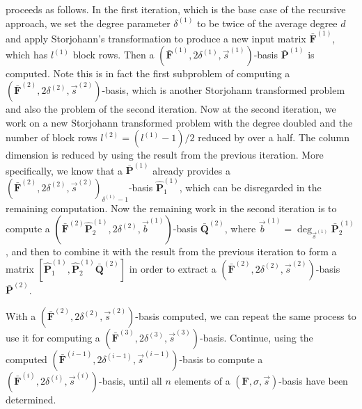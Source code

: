  proceeds as follows. In the first iteration,
which is the base case of the recursive approach, we set the degree
parameter $\delta^{\left(1\right)}$ to be twice of the average degree
$d$ and apply Storjohann's transformation to produce a new input
matrix $\bar{\mathbf{F}}^{\left(1\right)}$, which has $l^{\left(1\right)}$
block rows. Then a $(\bar{\mathbf{F}}^{\left(1\right)},2\delta^{\left(1\right)},\vec{s}^{\left(1\right)})$-basis
$\bar{\mathbf{P}}^{\left(1\right)}$ is computed. Note this is in
fact the first subproblem of computing a $(\bar{\mathbf{F}}^{\left(2\right)},2\delta^{\left(2\right)},\vec{s}^{\left(2\right)})$-basis,
which is another Storjohann transformed problem and also the problem
of the second iteration. Now at the second iteration, we work on a
new Storjohann transformed problem with the degree doubled and the
number of block rows $l^{\left(2\right)}=(l^{\left(1\right)}-1)/2$
reduced by over a half. The column dimension is reduced by using the
result from the previous iteration. More specifically, we know that
a $\bar{\mathbf{P}}^{\left(1\right)}$ already provides a $(\bar{\mathbf{F}}^{\left(2\right)},2\delta^{\left(2\right)},\vec{s}^{\left(2\right)})_{\delta^{\left(1\right)}-1}$-basis
$\hat{\mathbf{P}}_{1}^{\left(1\right)}$, which can be disregarded
in the remaining computation. Now the remaining work in the second
iteration is to compute a $(\bar{\mathbf{F}}^{\left(2\right)}\hat{\mathbf{P}}_{2}^{\left(1\right)},2\delta^{\left(2\right)},\vec{b}^{\left(1\right)})$-basis
$\bar{\mathbf{Q}}^{\left(2\right)}$, where $\vec{b}^{\left(1\right)}=\deg_{\vec{s}^{\left(1\right)}}\bar{\mathbf{P}}_{2}^{\left(1\right)}$,
and then to combine it with the result from the previous iteration
to form a matrix $[\hat{\mathbf{P}}_{1}^{\left(1\right)},\hat{\mathbf{P}}_{2}^{\left(1\right)}\bar{\mathbf{Q}}^{\left(2\right)}]$
in order to extract a $(\bar{\mathbf{F}}^{\left(2\right)},2\delta^{\left(2\right)},\vec{s}^{\left(2\right)})$-basis
$\bar{\mathbf{P}}^{\left(2\right)}$.

With a $(\bar{\mathbf{F}}^{\left(2\right)},2\delta^{\left(2\right)},\vec{s}^{\left(2\right)})$-basis
computed, we can repeat the same process to use it for computing a
$(\bar{\mathbf{F}}^{\left(3\right)},2\delta^{\left(3\right)},\vec{s}^{\left(3\right)})$-basis.
Continue, using the computed $(\bar{\mathbf{F}}^{\left(i-1\right)},2\delta^{\left(i-1\right)},\vec{s}^{\left(i-1\right)})$-basis
to compute a $(\bar{\mathbf{F}}^{\left(i\right)},2\delta^{\left(i\right)},\vec{s}^{\left(i\right)})$-basis,
until all $n$ elements of a $\left(\mathbf{F},\sigma,\vec{s}\right)$-basis
have been determined.



%
\begin{comment}
\begin{thm}
Algorithm \prettyref{alg:mab} computes a $\left(\mathbf{F},\sigma,\vec{s}\right)$-basis
correctly.\end{thm}
\begin{pf}
This follows from \prettyref{lem:simplifySecondSubproblem}, \prettyref{lem:disregardComputedBasisElements},
and \prettyref{lem:computationAtTopLevel}. 
\end{pf}

\end{comment}
{} 
